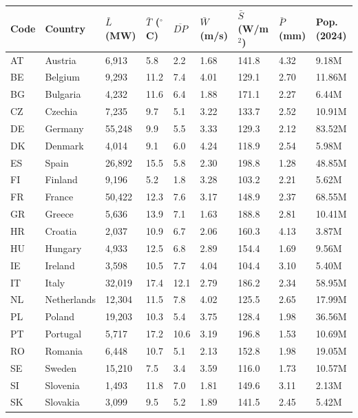 
\begin{tabular}{lllllllll}
\toprule
Code & Country & $\bar{L}$ (MW) & $\bar{T}$ ($^\circ$C) & $\overline{DP}$ & $\bar{W}$ (m/s) & $\bar{S}$ (W/m$^2$) & $\bar{P}$ (mm) & Pop. (2024)\\
\midrule
AT & Austria & 6,913 & 5.8 & 2.2 & 1.68 & 141.8 & 4.32 & 9.18M\\
BE & Belgium & 9,293 & 11.2 & 7.4 & 4.01 & 129.1 & 2.70 & 11.86M\\
BG & Bulgaria & 4,232 & 11.6 & 6.4 & 1.88 & 171.1 & 2.27 & 6.44M\\
CZ & Czechia & 7,235 & 9.7 & 5.1 & 3.22 & 133.7 & 2.52 & 10.91M\\
DE & Germany & 55,248 & 9.9 & 5.5 & 3.33 & 129.3 & 2.12 & 83.52M\\
DK & Denmark & 4,014 & 9.1 & 6.0 & 4.24 & 118.9 & 2.54 & 5.98M\\
ES & Spain & 26,892 & 15.5 & 5.8 & 2.30 & 198.8 & 1.28 & 48.85M\\
FI & Finland & 9,196 & 5.2 & 1.8 & 3.28 & 103.2 & 2.21 & 5.62M\\
FR & France & 50,422 & 12.3 & 7.6 & 3.17 & 148.9 & 2.37 & 68.55M\\
GR & Greece & 5,636 & 13.9 & 7.1 & 1.63 & 188.8 & 2.81 & 10.41M\\
HR & Croatia & 2,037 & 10.9 & 6.7 & 2.06 & 160.3 & 4.13 & 3.87M\\
HU & Hungary & 4,933 & 12.5 & 6.8 & 2.89 & 154.4 & 1.69 & 9.56M\\
IE & Ireland & 3,598 & 10.5 & 7.7 & 4.04 & 104.4 & 3.10 & 5.40M\\
IT & Italy & 32,019 & 17.4 & 12.1 & 2.79 & 186.2 & 2.34 & 58.95M\\
NL & Netherlands & 12,304 & 11.5 & 7.8 & 4.02 & 125.5 & 2.65 & 17.99M\\
PL & Poland & 19,203 & 10.3 & 5.4 & 3.75 & 128.4 & 1.98 & 36.56M\\
PT & Portugal & 5,717 & 17.2 & 10.6 & 3.19 & 196.8 & 1.53 & 10.69M\\
RO & Romania & 6,448 & 10.7 & 5.1 & 2.13 & 152.8 & 1.98 & 19.05M\\
SE & Sweden & 15,210 & 7.5 & 3.4 & 3.59 & 116.0 & 1.73 & 10.57M\\
SI & Slovenia & 1,493 & 11.8 & 7.0 & 1.81 & 149.6 & 3.11 & 2.13M\\
SK & Slovakia & 3,099 & 9.5 & 5.2 & 1.89 & 141.5 & 2.45 & 5.42M\\
\bottomrule
\end{tabular}
